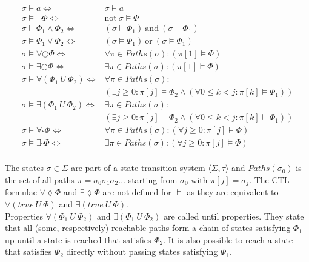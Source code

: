 \documentclass[11pt,a4paper,titlepage]{article}
\theoremstyle{definition}
\begin{document}
\begin{align*}
    \sigma \models a  \iff &\sigma \models a \\ 
    \sigma \models \neg \Phi  \iff &\text{not} \ \sigma \models \Phi \\ 
    \sigma \models \Phi_1 \land \Phi_2   \iff &(\sigma \models \Phi_1) \ \text{and} \ (\sigma \models \Phi_1) \\ 
    \sigma \models \Phi_1 \lor \Phi_2   \iff &(\sigma \models \Phi_1) \ \text{or} \ (\sigma \models \Phi_1) \\ 
    \sigma \models \forall\bigcirc\Phi \iff  &\forall \pi \in Paths(\sigma) \colon (\pi [1] \models \Phi) \\ 
    \sigma \models \exists\bigcirc\Phi \iff  &\exists \pi \in Paths(\sigma) \colon (\pi [1] \models \Phi) \\ 
    \sigma \models \forall(\Phi_1 \ U \ \Phi_2) \iff &\forall \pi \in Paths(\sigma) \colon \\
    &(\exists j \geq 0 \colon \pi[j] \models \Phi_2 \land (\forall 0 \leq k < j \colon \pi[k] \models \Phi_1)) \\ 
    \sigma \models \exists(\Phi_1 \ U \ \Phi_2) \iff &\exists \pi \in Paths(\sigma) \colon\\
    &(\exists j \geq 0 \colon \pi[j] \models \Phi_2 \land (\forall 0 \leq k < j \colon \pi[k] \models \Phi_1)) \\ 
    \sigma \models \forall\square\Phi \iff  &\forall \pi \in Paths(\sigma) \colon (\forall j \geq 0 \colon \pi[j] \models \Phi) \\ 
    \sigma \models \exists\square\Phi \iff  &\exists \pi \in Paths(\sigma) \colon (\forall j \geq 0 \colon \pi[j] \models \Phi) \\ 
\end{align*}

The states $\sigma \in \Sigma$ are part of a state transition system $\langle \Sigma, \tau \rangle$ and 
$Paths(\sigma_0)$ is the set of all paths $\pi = \sigma_0 \sigma_1 \sigma_2 \dots$ starting from $\sigma_0$ with $\pi[j] = \sigma_j$.
The CTL formulae $\forall\lozenge\Phi$ and $\exists\lozenge\Phi$ are not defined for $\models$ as they are equivalent to 
$\forall(true \ U \ \Phi)$ and $\exists(true \ U \ \Phi)$. \\

Properties $\forall(\Phi_1 \ U \ \Phi_2)$ and $\exists(\Phi_1 \ U \ \Phi_2)$ are called \textsf{until} properties. They state that 
all (some, respectively) reachable paths form a chain of states satisfying $\Phi_1$ up until a state is reached that satisfies $\Phi_2$.
It is also possible to reach a state that satisfies $\Phi_2$ directly without passing states satisfying $\Phi_1$.\\
\end{document}
